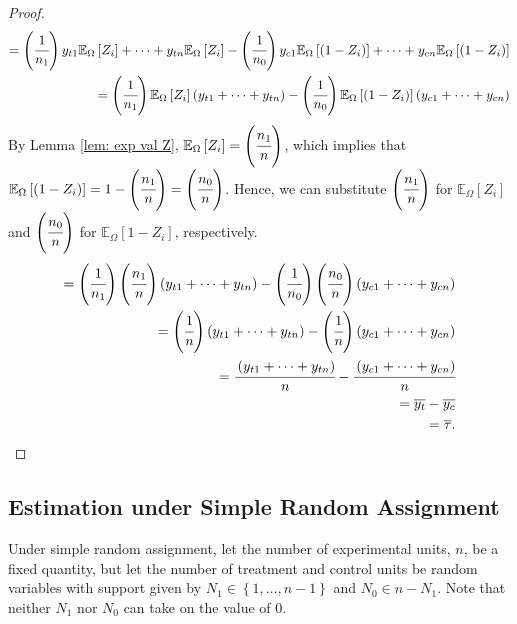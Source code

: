 \documentclass[12pt,leqno]{article}
\theoremstyle{newstyle}
\begin{document}
\begin{proof}
\begin{align*}
= \left(\cfrac{1}{n_1} \right) y_{t1}\mathbb{E}_{\Omega} \left[ Z_i \right] + \dots + y_{tn}\mathbb{E}_{\Omega} \left[Z_i\right] - \left(\cfrac{1}{n_0}\right) y_{c1}\mathbb{E}_{\Omega}\left[\left(1 - Z_i\right) \right] + \dots + y_{cn}\mathbb{E}_{\Omega} \left[\left(1 - Z_i\right) \right] \\
= \left(\cfrac{1}{n_1} \right) \mathbb{E}_{\Omega} \left[ Z_i \right] \left(y_{t1} + \dots + y_{tn} \right) - \left(\cfrac{1}{n_0}\right) \mathbb{E}_{\Omega}\left[\left(1 - Z_i\right) \right] \left(y_{c1} + \dots + y_{cn} \right) \\
\end{align*}
By Lemma \ref{lem: exp val Z}, $\mathbb{E}_{\Omega}\left[Z_i \right] = \left(\cfrac{n_1}{n}\right)$, which implies that $\mathbb{E}_{\Omega}\left[\left(1 - Z_i\right) \right] = 1 - \left(\cfrac{n_1}{n}\right) = \left(\cfrac{n_0}{n}\right)$. Hence, we can substitute $\left(\cfrac{n_1}{n}\right)$ for $\mathbb{E}_{\Omega}\left[Z_i \right]$ and $\left(\cfrac{n_0}{n}\right)$ for $\mathbb{E}_{\Omega}\left[1 - Z_i \right]$, respectively.
\begin{align*}
= \left(\cfrac{1}{n_1} \right) \left(\cfrac{n_1}{n}\right) \left(y_{t1} + \dots + y_{tn} \right) - \left(\cfrac{1}{n_0}\right) \left(\cfrac{n_0}{n}\right) \left(y_{c1} + \dots + y_{cn} \right) \\
= \left(\cfrac{1}{n} \right) \left(y_{t1} + \dots + y_{tn} \right) - \left(\cfrac{1}{n}\right) \left(y_{c1} + \dots + y_{cn} \right) \\
= \cfrac{\left(y_{t1} + \dots + y_{tn} \right)}{n} - \cfrac{\left(y_{c1} + \dots + y_{cn} \right)}{n} \\
= \overline{y_{t}} - \overline{y_{c}} \\
= \overline{\tau}.
\end{align*}
\end{proof}

\subsection{Estimation under Simple Random Assignment}

Under simple random assignment, let the number of experimental units, $n$, be a fixed quantity, but let the number of treatment and control units be random variables with support given by $N_1 \in \left\{1, \dots , n - 1\right\}$ and $N_0 \in n - N_1$. Note that neither $N_1$ nor $N_0$ can take on the value of $0$.
\end{document}
